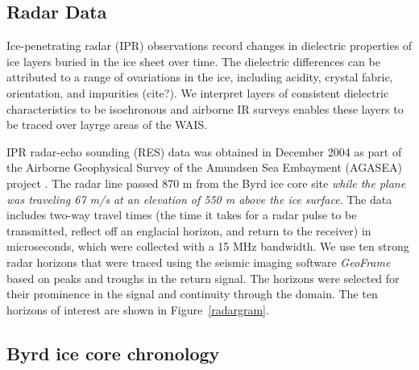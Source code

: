 \documentclass[12pt]{article}
\begin{document}
\subsection{Radar Data}

Ice-penetrating radar (IPR) observations record changes in dielectric properties of ice layers buried in the ice sheet over time. The dielectric differences can be attributed to a range of ovariations in the ice, including acidity, crystal fabric, orientation, and impurities (cite?). We interpret layers of consistent dielectric characteristics to be isochronous \citep{eisen04} and airborne IR surveys enables these layers to be traced over layrge areas of the WAIS. 

IPR radar-echo sounding (RES) data was obtained in December 2004 as part of the Airborne Geophysical Survey of the Amundsen Sea Embayment (AGASEA) project \citep{holt06}. The radar line passed 870 m from the Byrd ice core site \textit{while the plane was traveling 67 m/s at an elevation of 550 m above the ice surface}. The data includes two-way travel times (the time it takes for a radar pulse to be transmitted, reflect off an englacial horizon, and return to the receiver) in microseconds, which were collected with a 15 MHz bandwidth. We use ten strong radar horizons that were traced using the seismic imaging software \textit{GeoFrame} based on peaks and troughs in the return signal. The horizons were selected for their prominence in the signal and continuity through the domain. The ten horizons of interest are shown in Figure~\ref{radargram}.




\subsection{Byrd ice core chronology}
\end{document}
